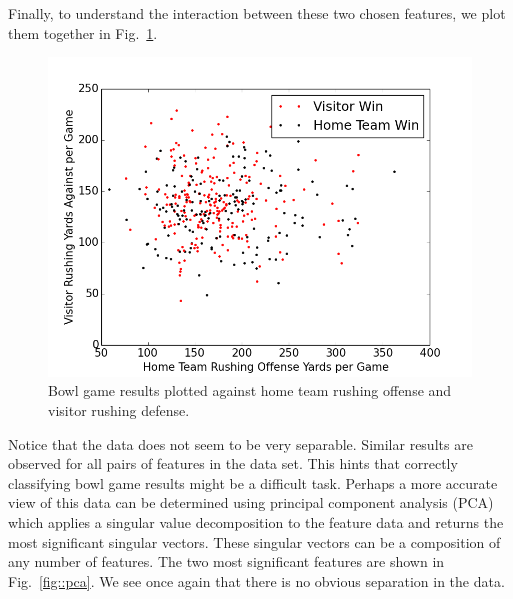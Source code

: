 \documentclass[12pt]{article}
\begin{document}
Finally, to understand the interaction between these two chosen features, we plot them together in Fig.~\ref{fig::separation}.
\begin{figure}[ht!]
	\begin{center}
		\includegraphics[scale=0.45]{figs/rush_matchup.png}
	\end{center}
	\caption{Bowl game results plotted against home team rushing offense and visitor rushing defense.}
	\label{fig::separation}
\end{figure}
Notice that the data does not seem to be very separable. Similar results are observed for all pairs of features in the data set. This hints that correctly classifying bowl game results might be a difficult task. 
\newpage
Perhaps a more accurate view of this data can be determined using principal component analysis (PCA) which applies a singular value decomposition to the feature data and returns the most significant singular vectors. These singular vectors can be a composition of any number of features. The two most significant features are shown in Fig.~\ref{fig::pca}. We see once again that there is no obvious separation in the data.
\end{document}
